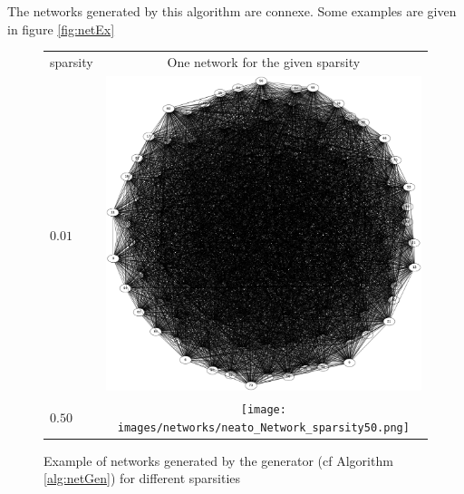\documentclass[a4paper,10pt]{article}
\begin{document}
The networks generated by this algorithm are connexe. Some examples are given in figure \ref{fig:netEx}
\begin{figure}[H]
\caption{Example of networks generated by the generator (cf Algorithm \ref{alg:netGen}) for different sparsities}
\centering
\begin{tabular}{lc}
sparsity&One network for the given sparsity\\
$0.01$&\includegraphics[width=\imgSize]{images/networks/neato_Network_sparsity1.png}\\
$0.50$&\texttt{[image: images/networks/neato\_Network\_sparsity50.png]}\\

\end{tabular}
\end{figure}
\end{document}
